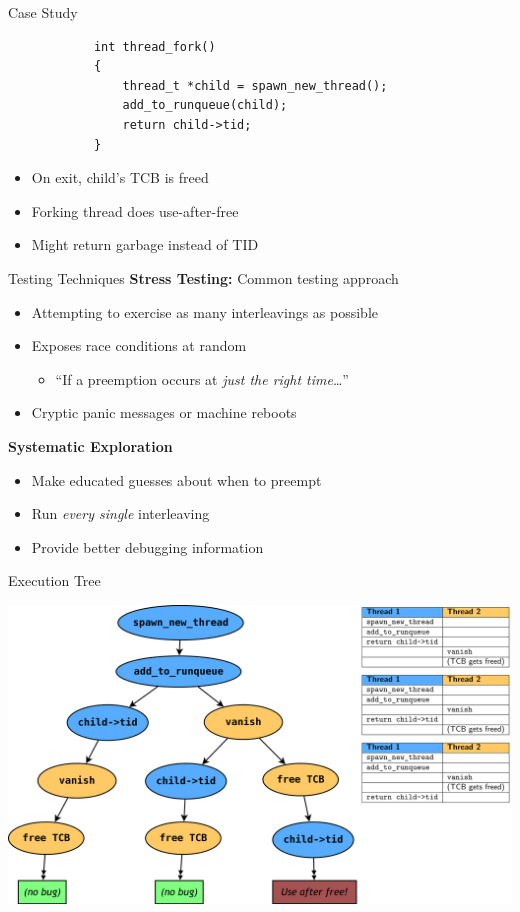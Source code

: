 \documentclass[xcolor=dvipsnames]{beamer}
\begin{document}
\begin{frame}[fragile]{Case Study}
	\begin{center}
	\begin{verbatim}
	        int thread_fork()
	        {
	            thread_t *child = spawn_new_thread();
	            add_to_runqueue(child);
	            return child->tid;
	        }
	\end{verbatim}
	\end{center}

	\begin{itemize}
		\item On exit, child's TCB is freed
		\item Forking thread does use-after-free
		\item Might return garbage instead of TID
	\end{itemize}
\end{frame}

\begin{frame}{Testing Techniques} %
	\textbf{Stress Testing:} Common testing approach
	\begin{itemize}
		\item Attempting to exercise as many interleavings as possible
		\item Exposes race conditions at random
		\begin{itemize}
			\item ``If a preemption occurs at {\em just the right time}\dots''
		\end{itemize}
		\item Cryptic panic messages or machine reboots
	\end{itemize}
	\linegap

	{\bf Systematic Exploration} 
	\begin{itemize}
		\item Make educated guesses about when to preempt
		\item Run {\em every single} interleaving
		\item Provide better debugging information
	\end{itemize}
\end{frame}

\begin{frame}{Execution Tree} %
	\begin{center}
		\includegraphics[width=\textwidth]{tree.png}
	\end{center}
\end{frame}
\end{document}

